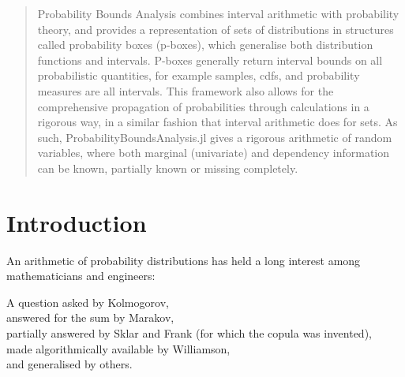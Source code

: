 \documentclass{juliacon}
\begin{document}


\maketitle

\begin{abstract}

Probability Bounds Analysis combines interval arithmetic with probability theory, and provides a representation of sets of distributions in structures called probability boxes (p-boxes), which generalise both distribution functions and intervals. P-boxes generally return interval bounds on all probabilistic quantities, for example samples, cdfs, and probability measures are all intervals. This framework also allows for the comprehensive propagation of probabilities through calculations in a rigorous way, in a similar fashion that interval arithmetic does for sets. As such, ProbabilityBoundsAnalysis.jl gives a rigorous arithmetic of random variables, where both marginal (univariate) and dependency information can be known, partially known or missing completely.

\end{abstract}

\section{Introduction}
\label{sec:intro}


An arithmetic of probability distributions has held a long interest among mathematicians and engineers:
\begin{displayquote}
  A question asked by Kolmogorov, \\
  answered for the sum by Marakov, \\
  partially answered by Sklar and Frank (for which the copula was invented),\\
  made algorithmically available by Williamson, \\
  and generalised by others.
\end{displayquote}
\end{document}
